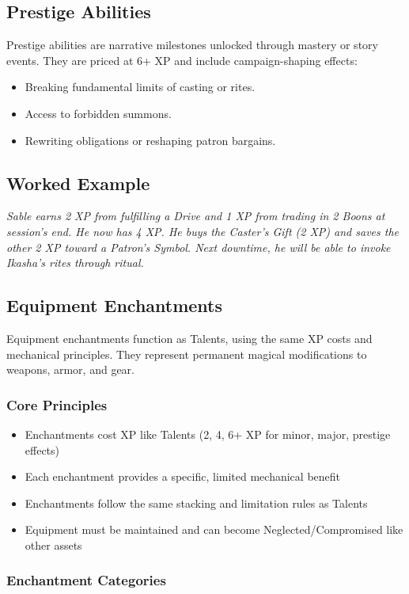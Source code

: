 \subsection{Prestige Abilities}
Prestige abilities are narrative milestones unlocked through mastery or story events. They are priced at 6+ XP and include campaign-shaping effects:
\begin{itemize}
  \item Breaking fundamental limits of casting or rites.
  \item Access to forbidden summons.
  \item Rewriting obligations or reshaping patron bargains.
\end{itemize}

\subsection{Worked Example}
\emph{Sable earns 2 XP from fulfilling a Drive and 1 XP from trading in 2 Boons at session’s end. He now has 4 XP. He buys the Caster’s Gift (2 XP) and saves the other 2 XP toward a Patron’s Symbol. Next downtime, he will be able to invoke Ikasha’s rites through ritual.}

\subsection{Equipment Enchantments}

Equipment enchantments function as Talents, using the same XP costs and mechanical principles. They represent permanent magical modifications to weapons, armor, and gear.

\subsubsection{Core Principles}

\begin{itemize}
\item Enchantments cost XP like Talents (2, 4, 6+ XP for minor, major, prestige effects)
\item Each enchantment provides a specific, limited mechanical benefit
\item Enchantments follow the same stacking and limitation rules as Talents
\item Equipment must be maintained and can become Neglected/Compromised like other assets
\end{itemize}

\subsubsection{Enchantment Categories}

